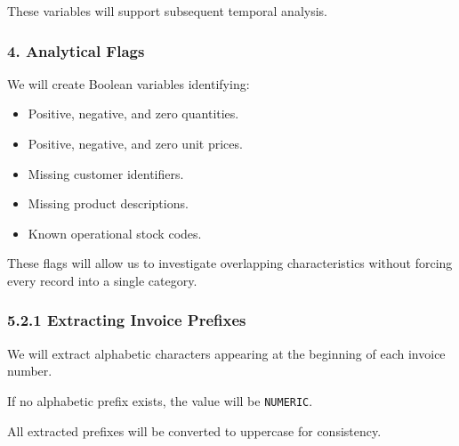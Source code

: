\documentclass[11pt]{article}
\providecommand{\tightlist}{%
      \setlength{\itemsep}{0pt}\setlength{\parskip}{0pt}}
\begin{document}
These variables will support subsequent temporal analysis.

\subsubsection{4. Analytical Flags}\label{analytical-flags}

We will create Boolean variables identifying:

\begin{itemize}
\tightlist
\item
  Positive, negative, and zero quantities.
\item
  Positive, negative, and zero unit prices.
\item
  Missing customer identifiers.
\item
  Missing product descriptions.
\item
  Known operational stock codes.
\end{itemize}

These flags will allow us to investigate overlapping characteristics
without forcing every record into a single category.

    \subsubsection{5.2.1 Extracting Invoice
Prefixes}\label{extracting-invoice-prefixes}

We will extract alphabetic characters appearing at the beginning of each
invoice number.

If no alphabetic prefix exists, the value will be \texttt{NUMERIC}.

All extracted prefixes will be converted to uppercase for consistency.
\end{document}

